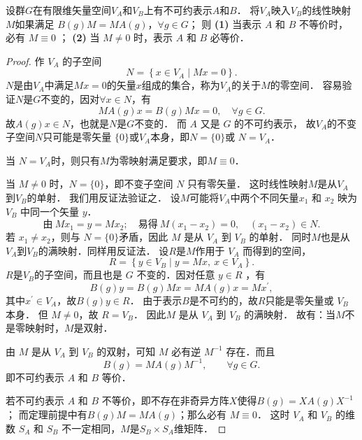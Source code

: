 \begin{theorem}\label{chlar:thm_schur-lemma-1}
	设群$G$在有限维矢量空间$V_A$和$V_B$上有不可约表示$A$和$B$．
	将$V_A$映入$V_B$的线性映射$M$如果满足
	$B\left(g\right) M=M A\left(g\right)$，$\forall g \in G$；	则
	{\bfseries (1)} 当表示 $A$ 和 $B$ 不等价时，必有 $M \equiv 0$ ；
	{\bfseries (2)} 当 $M \neq 0$ 时，表示 $A$ 和 $B$ 必等价．
\end{theorem}
\begin{proof}
	作 $V_A$ 的子空间
	\begin{equation*}
		N=\left\{x \in V_A \mid M x=0\right\} .
	\end{equation*}
	$N$是由$V_A$中满足$M x=0$的矢量$x$组成的集合，称为$V_A$的关于$M$的零空间．
	容易验证$N$是$G$不变的，因对$\forall x \in N$，有
	\begin{equation*}
		M A\left(g\right) x=B\left(g\right) M x=0, \quad \forall g\in G .
	\end{equation*}
	故$A\left(g\right) x \in N$，也就是$N$是$G$不变的．
	而 $A$ 又是 $G$ 的不可约表示，
	故$V_A$的不变子空间$N$只可能是零矢量 $\{0\}$或$V_A$本身，即$N=\{0\}$或 $N=V_A$．
	
	当 $N=V_A$时，则只有$M$为零映射满足要求，即$M \equiv 0$．
	
	当 $M \neq 0$ 时，$N=\{0\}$，即不变子空间 $N$ 只有零矢量．
	这时线性映射$M$是从$V_A$到$V_B$的单射． 我们用反证法验证之．
	设$M$可能将$V_A$中两个不同矢量$x_1$ 和 $x_2$ 映为 $V_B$ 中同一个矢量 $y$．
	\begin{equation*}
		\text{由} \  M x_1=y= M x_2; \quad \text{易得}\ 
		M\left(x_1-x_2\right)=0, \quad\left(x_1-x_2\right) \in N.
	\end{equation*}
	若 $x_1 \neq x_2$，则与 $N=\{0\}$矛盾，因此 $M$ 是从 $V_A$ 到 $V_B$ 的单射．
	同时$M$也是从$V_A$到$V_B$的满映射．同样用反证法．
	设$R$是$M$作用于 $V_A$ 而得到的空间，
	\begin{equation*}
		R=\left\{y \in V_B \mid y=M x,\  x \in V_A\right\} .
	\end{equation*}
	$R$是$V_B$的子空间，而且也是 $G$ 不变的．因对任意 $y \in R$ ，有
	\begin{equation*}
		B\left(g\right) y=B\left(g\right) M x=M A\left(g\right) x=M x^{\prime},
	\end{equation*}
	其中$x^{\prime} \in V_A$，故$B\left(g\right) y \in R $．
	由于表示$B$是不可约的，故$R$只能是零矢量或 $V_B$ 本身．
	但 $M \neq 0$，故 $R=V_B$．
	因此$M$ 是从 $V_A$ 到 $V_B$ 的满映射．
	故有：当$M$不是零映射时，$M$是双射．
	
	由 $M$ 是从 $V_A$ 到 $V_B$ 的双射，可知 $M$ 必有逆 $M^{-1}$ 存在．而且
	\begin{equation*}
		B\left(g\right)=M A\left(g\right) M^{-1},  \qquad \forall g\in G.
	\end{equation*}
	即不可约表示 $A$ 和 $B$ 等价．
	
	
	若不可约表示 $A$ 和 $B$ 不等价，即不存在非奇异方阵$X$使得$B(g)=X A(g) X^{-1}$；
	而定理前提中有$B(g) M=M A(g)$；那么必有 $M \equiv 0$．
	这时 $V_A$ 和 $V_B$ 的维数 $S_A$ 和 $S_B$ 不一定相同，$M$是$S_B \times S_A$维矩阵．
\end{proof}

